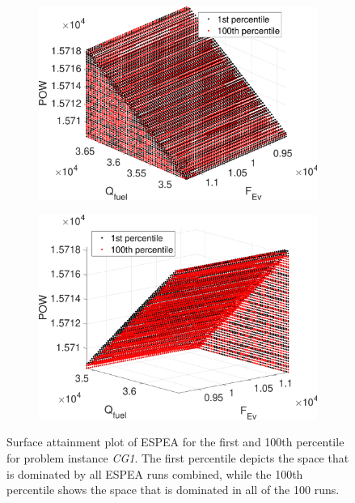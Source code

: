 \begin{figure}
	\begin{subfigure}{0.47\textwidth}
	\includegraphics[width=\textwidth]{figures/safront_cropped.pdf}
	\end{subfigure}
\hfill
	\begin{subfigure}{0.47\textwidth}
	\includegraphics[width=\textwidth]{figures/saback_cropped.pdf}
	\end{subfigure}
\caption{Surface attainment plot of ESPEA for the first and 100th percentile for problem instance \textit{CG1}. The first percentile depicts the space that is dominated by all ESPEA runs combined, while the 100th percentile shows the space that is dominated in all of the 100 runs.}
\label{fig:surfaceattainment}
\end{figure}

